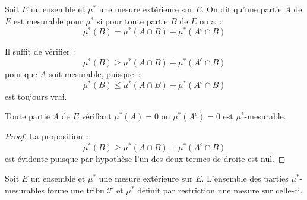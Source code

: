 \begin{mandatory}
\begin{defn}
Soit $E$ un ensemble et $\mu^*$ une mesure extérieure sur $E$. On dit
qu'une partie $A$ de $E$ est mesurable pour $\mu^*$ si pour toute
partie $B$ de $E$ on a~:
\[
\mu^*(B) = \mu^*(A\cap B) + \mu^*(A^c \cap B)
\]
\end{defn}
\end{mandatory}
\begin{rem}
Il suffit de vérifier~:
\[
\mu^*(B) \geq \mu^*(A\cap B) + \mu^*(A^c \cap B)
\]
pour que $A$ soit mesurable, puisque~:
\[
\mu^*(B) \leq \mu^*(A\cap B) + \mu^*(A^c \cap B)
\]
est toujours vrai.
\end{rem}
\begin{prop}
Toute partie $A$ de $E$ vérifiant $\mu^*(A)=0$ ou $\mu^*(A^c)=0$ est
$\mu^*$-mesurable. 
\end{prop}
\begin{proof}
La proposition~:
\[
\mu^*(B) \geq \mu^*(A\cap B) + \mu^*(A^c \cap B)
\]
est évidente puisque par hypothèse l'un des deux termes de droite est nul.
\end{proof}
\begin{mandatory}
\begin{theorem}
Soit $E$ un ensemble et $\mu^*$ une mesure extérieure sur
$E$. L'ensemble des parties $\mu^*$-mesurables forme une tribu
$\mathcal{T}$ et
$\mu^*$ définit par restriction une mesure sur celle-ci.
\end{theorem}
\end{mandatory}
